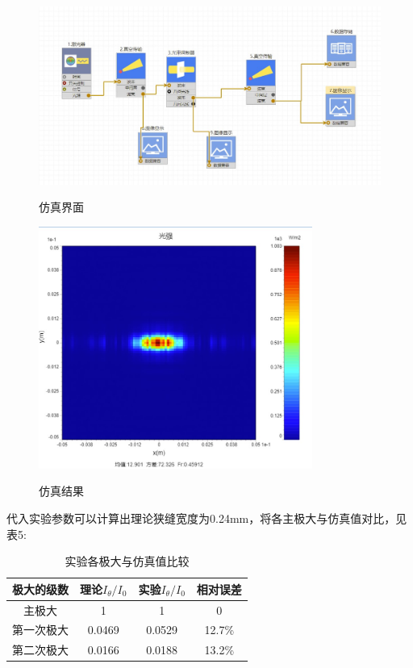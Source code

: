 \documentclass[12pt,a4paper,UTF8]{ctexart}
\begin{document}
\begin{figure}[htbp]
	\caption{仿真界面}
	\centering
	\includegraphics[width=\textwidth]{img//im.jpg}
	\label{fig:5}
\end{figure}
\begin{figure}[htbp]
	\caption{仿真结果}
	\centering
	\includegraphics[width=0.8\textwidth]{img//re.jpg}
	\label{fig:4}
\end{figure}

代入实验参数可以计算出理论狭缝宽度为0.24mm，将各主极大与仿真值对比，见表5:
\begin{table}[htbp]
	\caption{实验各极大与仿真值比较}
	\centering
    \begin{tabular}{cccc}
	\toprule
	极大的级数&理论$I_\theta/I_0$&实验$I_\theta/I_0$&相对误差\\
	\midrule
	主极大&1&1&0\\
    第一次极大&0.0469&	0.0529& 12.7\%\\
    第二次极大&0.0166&	0.0188& 13.2\%\\
    \bottomrule
	\end{tabular}%
	\label{tab:data2}%
\end{table}%
\end{document}
